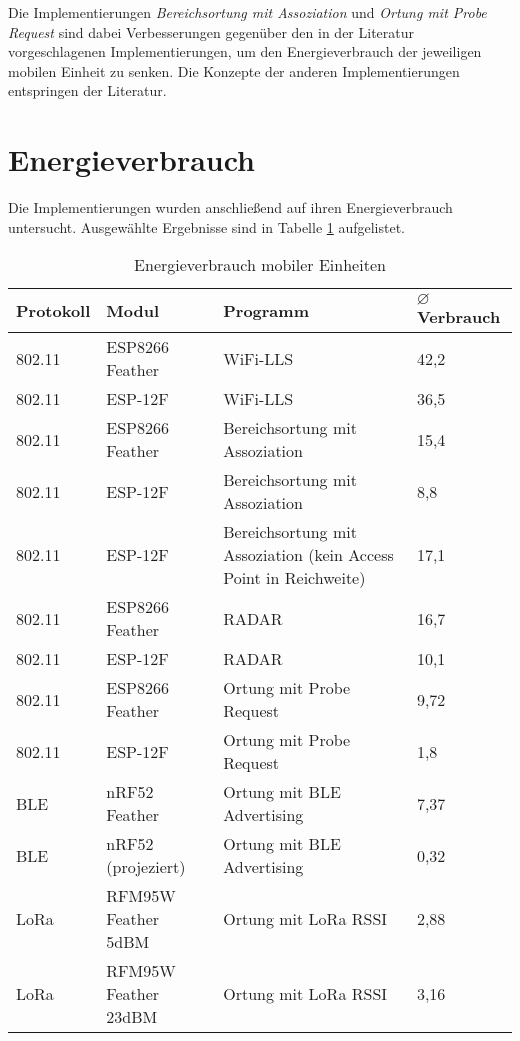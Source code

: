 Die Implementierungen \emph{Bereichsortung mit Assoziation} und \emph{Ortung mit Probe Request} sind dabei Verbesserungen gegenüber den in der Literatur vorgeschlagenen Implementierungen, um den Energieverbrauch der jeweiligen mobilen Einheit zu senken.
Die Konzepte der anderen Implementierungen entspringen der Literatur.

\section{Energieverbrauch}
Die Implementierungen wurden anschließend auf ihren Energieverbrauch untersucht.
Ausgewählte Ergebnisse sind in Tabelle \ref{table:consumptions} aufgelistet.


\begin{table}[h]
	\centering
	\caption{Energieverbrauch mobiler Einheiten}
	\label{table:consumptions}
	\begin{tabular}{p{1.8cm}|p{3.5cm}|p{6cm}|p{2.3cm}}
		Protokoll & Modul & Programm  & $\varnothing$ Verbrauch\\
		\hline
		802.11 & ESP8266 Feather & WiFi-LLS & 42,2 \\
		802.11 & ESP-12F & WiFi-LLS & 36,5\\
		802.11 & ESP8266 Feather & Bereichsortung mit Assoziation & 15,4 \\
		802.11 & ESP-12F & Bereichsortung mit Assoziation & 8,8\\
		802.11 & ESP-12F & Bereichsortung mit Assoziation (kein Access Point in Reichweite) & 17,1\\
		\hline
		802.11 & ESP8266 Feather & RADAR & 16,7\\
		802.11 & ESP-12F & RADAR & 10,1\\
		802.11 & ESP8266 Feather & Ortung mit Probe Request & 9,72\\
		802.11 & ESP-12F & Ortung mit Probe Request & 1,8\\
		\hline
		BLE & nRF52 Feather & Ortung mit BLE Advertising & 7,37\\
		BLE & nRF52 (projeziert) & Ortung mit BLE Advertising & 0,32\\
		\hline
		LoRa & RFM95W Feather 5dBM & Ortung mit LoRa RSSI & 2,88\\
		LoRa & RFM95W Feather 23dBM & Ortung mit LoRa RSSI & 3,16\\
	\end{tabular}
\end{table}

